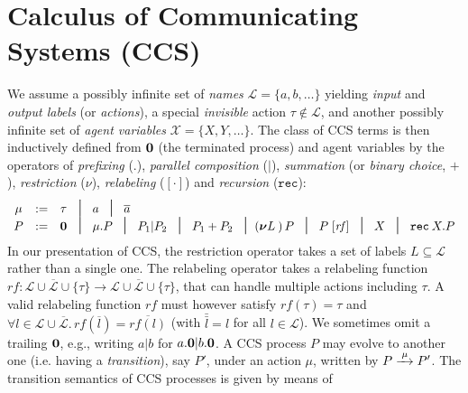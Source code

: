 
\section{Calculus of Communicating Systems (CCS)}
\label{ss:ccs}

We assume a possibly infinite set of \emph{names} $\mathscr{L} = \{a, b,
\ldots\}$ yielding \emph{input} and \emph{output labels} (or
\emph{actions}), a special \emph{invisible}
action $\tau \notin \mathscr{L}$, and another possibly infinite
set of \emph{agent variables} $\mathscr{X} = \{X, Y, \ldots\}$.
The class of CCS terms is then inductively
defined from ${\boldsymbol 0}$ (the terminated process) and agent variables by the operators
of \emph{prefixing} (.), \emph{parallel composition} ($|$),
\emph{summation}
(or \emph{binary choice}, $+$),
\emph{restriction} ($\nu$), \emph{relabeling} ($[\cdot]$) and
\emph{recursion} ($\texttt{rec}$):
\begin{equation*}
\begin{array}{cccl}
\mu  & := & \tau\!\!\!\! & \midd \; a  \; \midd \;  \outC a  \\
P  & := & \nil\!\!\!\! & \midd \;  \mu . P \; \midd \;  P_1 |  P_2 \; \midd  \;
P_1 + P_2 \; \midd 
(\res L)\, P
\; \midd \; P\; [\mathit{rf}]  %
\;  \midd \;  X \; \midd \; \recu X P
\end{array}
\end{equation*}
In our presentation of CCS, the restriction operator takes a set of labels $L
  \subseteq \mathscr{L}$ rather than a single one.  
The relabeling operator takes a relabeling function
  $\mathit{rf} \colon \mathscr{L} \cup \overline{\mathscr{L}} \cup
    \{\tau\} \rightarrow \mathscr{L} \cup \overline{\mathscr{L}} \cup
    \{\tau\}$, that can  handle multiple actions including $\tau$. A valid
    relabeling function $\mathit{rf}$ must however 
satisfy $\mathit{rf}(\tau) =
    \tau$ and $\forall l\in\mathscr{L} \cup \overline{\mathscr{L}}.\, \mathit{rf}(\overline{l}) =
    \overline{\mathit{rf}(l)}$ (with $\bar{\bar l} = l$ for all $l \in
    \mathscr{L}$).
We sometimes omit a trailing ${\boldsymbol 0}$, e.g., writing $a|b$ for $a.{\boldsymbol 0} |b .{\boldsymbol 0}$.
A CCS process $P$ may evolve to another one (i.e. having a \emph{transition}), say $P'$, under
  an action $\mu$, written by $P \arr{\mu} P'$.
The transition semantics of CCS processes is given by means of
